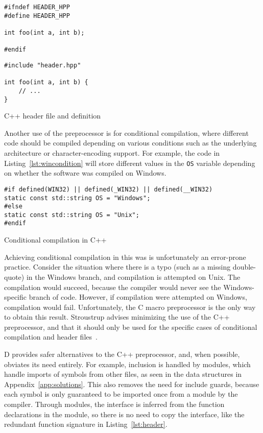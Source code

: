 \documentclass[finalcopy]{srpaper}
\begin{document}
\begin{listing}[H]
\begin{verbatim}
#ifndef HEADER_HPP
#define HEADER_HPP

int foo(int a, int b);

#endif
\end{verbatim}
\begin{verbatim}
#include "header.hpp"

int foo(int a, int b) {
    // ...
}
\end{verbatim}
\caption{C++ header file and definition}
\label{lst:header}
\end{listing}

Another use of the preprocessor is for conditional compilation, where different
code should be compiled depending on various conditions such as the underlying
architecture or character-encoding support. For example, the code in
Listing~\ref{lst:wincondition} will store different values in the \texttt{OS}
variable depending on whether the software was compiled on Windows.

\begin{listing}[H]
\begin{verbatim}
#if defined(WIN32) || defined(_WIN32) || defined(__WIN32)
static const std::string OS = "Windows";
#else
static const std::string OS = "Unix";
#endif
\end{verbatim}
\caption{Conditional compilation in C++}
\label{lst:wincondition}
\end{listing}

Achieving conditional compilation in this was is unfortunately an error-prone
practice. Consider the situation where there is a typo (such as a missing
double-quote) in the Windows branch, and compilation is attempted on Unix. The
compilation would succeed, because the compiler would never see the
Windows-specific branch of code. However, if compilation were attempted on
Windows, compilation would fail. Unfortunately, the C macro preprocessor is the
only way to obtain this result. Stroustrup advises minimizing the use of the
C++ preprocessor, and that it should only be used for the specific cases of
conditional compilation and header files~\cite{stroustrup2013the}.

D provides safer alternatives to the C++ preprocessor, and, when possible,
obviates its need entirely. For example, inclusion is handled by modules, which
handle imports of symbols from other files, as seen in the data structures in
Appendix~\ref{app:solutions}. This also removes the need for include guards,
because each symbol is only guaranteed to be imported once from a module by the
compiler. Through modules, the interface is inferred from the function
declarations in the module, so there is no need to copy the interface, like
the redundant function signature in Listing~\ref{lst:header}.
\end{document}
